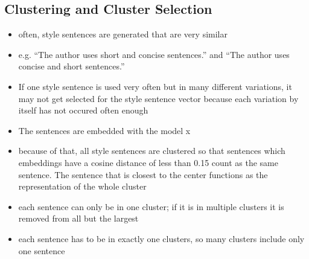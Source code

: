 \subsection{Clustering and Cluster Selection}

\begin{itemize}
  \item often, style sentences are generated that are very similar
  \item e.g. \enquote{The author uses short and concise sentences.} and \enquote{The author uses concise and short sentences.}
  \item If one style sentence is used very often but in many different variations, it may not get selected for the style sentence vector because each variation by itself has not occured often enough
  \item The sentences are embedded with the model x %
  \item because of that, all style sentences are clustered so that sentences which embeddings have a cosine distance of less than 0.15 count as the same sentence. The sentence that is closest to the center functions as the representation of the whole cluster
  \item each sentence can only be in one cluster; if it is in multiple clusters it is removed from all but the largest
  \item each sentence has to be in exactly one clusters, so many clusters include only one sentence
\end{itemize}